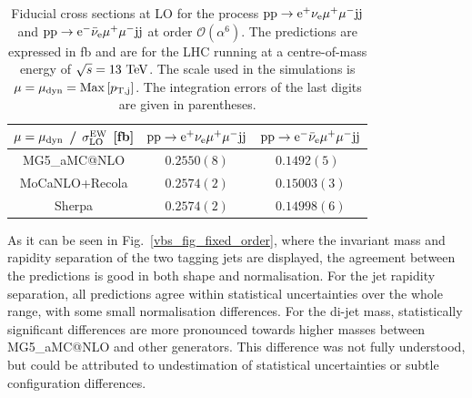 \documentclass[11pt]{cernrep}
\makeatletter
\newcommand{\MGaMC}{M\protect\scalebox{0.8}{AD}G\protect\scalebox{0.8}{RAPH}5\_aMC@NLO\xspace}
\makeatother
\begin{document}
\begin{table}
\begin{center} 
\begin{tabular}{ c | c | c }
 $\mu = \mu_{\rm dyn}$ / $\sigma_{\rm LO}^{\rm EW}$ [fb] & ${\rm p} {\rm p} \to {\rm e}^+  \nu_{\rm e}  \mu^+ \mu^- {\rm j} {\rm j}$  & ${\rm p} {\rm p} \to {\rm e}^-  \bar \nu_{\rm e}  \mu^+ \mu^- {\rm j} {\rm j}$  \\
  \hline\hline
  \MGaMC                  & $0.2550(8)$  & $0.1492(5)\phantom{0}$ \\
  {\sc MoCaNLO}+{\sc Recola}      & $0.2574(2)$  & $0.15003(3)$  \\
  {\sc Sherpa}                    & $0.2574(2)$  & $0.14998(6)$   \\
  \hline
\end{tabular}
\end{center}
\caption{
Fiducial cross sections at LO for the process ${\rm p}{\rm p}\to{\rm e}^+\nu_{\rm e}\mu^+\mu^-{\rm j}{\rm j}$ and ${\rm p}{\rm p}\to{\rm e}^-\bar\nu_{\rm e}\mu^+\mu^-{\rm j}{\rm j}$ at order $\mathcal{O} (\alpha^6)$.
The predictions are expressed in fb and are for the LHC running at a centre-of-mass energy of $\sqrt{s}=13 {\rm~TeV}$.
The scale used in the simulations is $\mu = \mu_{\rm dyn} = {\rm Max}\left[p_{\rm T, j}\right]$.
The integration errors of the last digits are given in parentheses.}
\label{table:xsectLOdyn}
\end{table}

As it can be seen in Fig.~\ref{vbs_fig_fixed_order}, where the invariant mass and rapidity separation of the two tagging jets are displayed, the agreement between the predictions is good in both shape and normalisation.
For the jet rapidity separation, all predictions agree within statistical uncertainties over the whole range, with some small normalisation differences. For the di-jet mass, statistically significant differences are more pronounced towards higher masses between \MGaMC and other generators. This difference was not fully understood, but could be attributed to undestimation of statistical uncertainties or subtle configuration differences.
\end{document}
